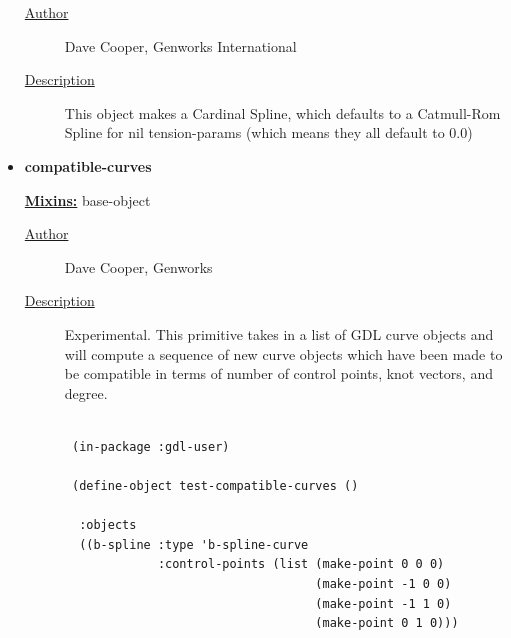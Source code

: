 \documentclass [11pt]{book}
\begin{document}
\begin{itemize}
\begin{description}
\item [
\underline{Author}]


Dave Cooper, Genworks International



\item [
\underline{Description}]


This object makes a Cardinal Spline, which defaults to a Catmull-Rom Spline for nil tension-params (which means they all default to 0.0)



\end{description}









\item {}
\label{prim:compatible-curves}
\textbf{compatible-curves}


\textbf{
\underline{Mixins:}} base-object





\begin{description}

\item [
\underline{Author}]


Dave Cooper, Genworks



\item [
\underline{Description}]


Experimental. This primitive takes in a list of GDL 
curve objects and will compute a sequence of new curve objects which have been made 
to be compatible in terms of number of control points, knot vectors, and degree.



\end{description}




\begin{figure}
\begin{lrbox}{\boxedverb}
\begin{minipage}{\linewidth}
{\small

\begin{verbatim}
 
 (in-package :gdl-user)

 (define-object test-compatible-curves ()
  
  :objects
  ((b-spline :type 'b-spline-curve
             :control-points (list (make-point 0 0 0)
                                   (make-point -1 0 0)
                                   (make-point -1 1 0)
                                   (make-point 0 1 0)))
   

\end{verbatim}}
\end{minipage}
\end{lrbox}
\end{figure}
\end{itemize}
\end{document}
